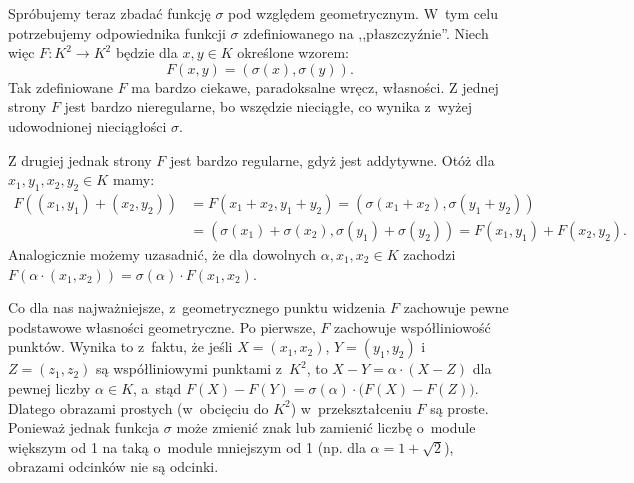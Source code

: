 Spróbujemy teraz zbadać funkcję $\sigma$ pod względem geometrycznym. W~tym celu potrzebujemy odpowiednika funkcji $\sigma$ zdefiniowanego na ,,płaszczyźnie''. Niech więc $F:K^2 \to K^2$ będzie dla $x,y \in K$ określone wzorem:
\[F(x,y) = (\sigma(x), \sigma(y)).\]
Tak zdefiniowane $F$ ma bardzo ciekawe, paradoksalne wręcz, własności.
Z jednej strony $F$ jest bardzo nieregularne, bo wszędzie nieciągłe, co wynika z~wyżej udowodnionej nieciągłości $\sigma$.

Z drugiej jednak strony $F$ jest bardzo regularne, gdyż jest addytywne. Otóż dla $x_1,y_1,x_2,y_2 \in K$ mamy:
\begin{align*}
    F((x_1,y_1) + (x_2,y_2)) & = F(x_1+x_2, y_1+y_2) = (\sigma(x_1+x_2), \sigma(y_1+y_2)) \\&= (\sigma(x_1)+\sigma(x_2), \sigma(y_1)+\sigma(y_2)) = F(x_1,y_1) + F(x_2,y_2).
\end{align*}
Analogicznie możemy uzasadnić, że dla dowolnych $\alpha,x_1,x_2\in K$
zachodzi $F(\alpha\cdot(x_1,x_2))=\sigma(\alpha)\cdot F(x_1,x_2)$.

Co dla nas najważniejsze, z~geometrycznego punktu widzenia $F$
zachowuje pewne podstawowe własności geometryczne.
Po pierwsze, $F$ zachowuje współliniowość punktów. Wynika to
z~faktu, że jeśli $X=(x_1,x_2)$, $Y=(y_1,y_2)$ i~$Z=(z_1,z_2)$ są współliniowymi
punktami z~$K^2$, to $X-Y=\alpha\cdot(X-Z)$ dla pewnej liczby $\alpha\in K$, a~stąd
$F(X)-F(Y)=\sigma(\alpha)\cdot\big(F(X)-F(Z)\big)$. Dlatego obrazami prostych
(w~obcięciu do $K^2$) w~przekształceniu $F$ są proste. Ponieważ jednak funkcja $\sigma$
może zmienić znak lub zamienić liczbę o~module większym od 1 na taką o~module
mniejszym od 1 (np. dla $\alpha=1+\sqrt{2}$), obrazami odcinków nie są odcinki.

